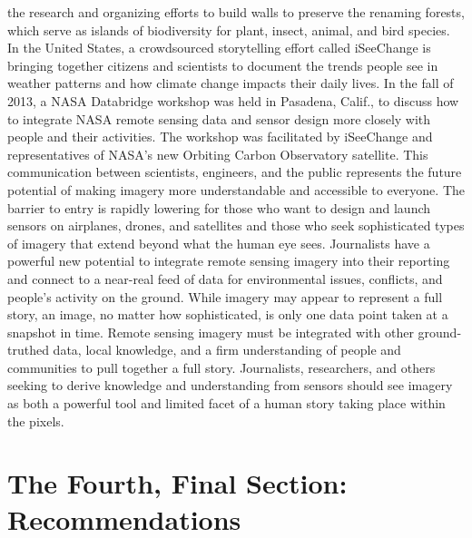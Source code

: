 \begin{itemize}
the research and organizing efforts to build walls to preserve the renaming
forests, which serve as islands of biodiversity for plant, insect, animal, and
bird species.
In the United States, a crowdsourced storytelling effort called iSeeChange
is bringing together citizens and scientists to document the trends people
see in weather patterns and how climate change impacts their daily lives. In
the fall of 2013, a NASA Databridge workshop was held in Pasadena, Calif.,
to discuss how to integrate NASA remote sensing data and sensor design
more closely with people and their activities. The workshop was facilitated
by iSeeChange and representatives of NASA's new Orbiting Carbon Observatory
satellite. This communication between scientists, engineers, and the
public represents the future potential of making imagery more understandable
and accessible to everyone.
The barrier to entry is rapidly lowering for those who want to design and
launch sensors on airplanes, drones, and satellites and those who seek
sophisticated types of imagery that extend beyond what the human eye sees.
Journalists have a powerful new potential to integrate remote sensing imagery
into their reporting and connect to a near-real feed of data for environmental
issues, conflicts, and people's activity on the ground. While imagery
may appear to represent a full story, an image, no matter how sophisticated,
is only one data point taken at a snapshot in time. Remote sensing imagery
must be integrated with other ground-truthed data, local knowledge,
and a firm understanding of people and communities to pull together a full
story. Journalists, researchers, and others seeking to derive knowledge and
understanding from sensors should see imagery as both a powerful tool and
limited facet of a human story taking place within the pixels.


\chapter{The Fourth, Final Section: Recommendations}



\end{itemize}
